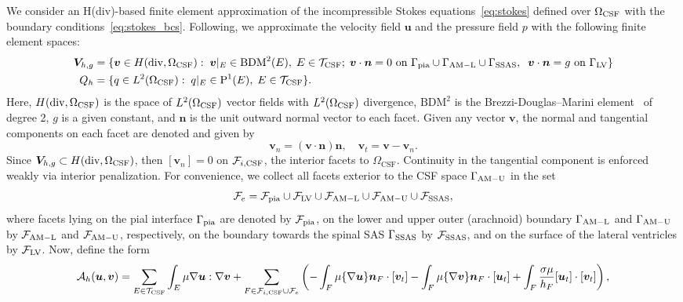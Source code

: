 \documentclass[fleqn,10pt]{wlscirep}
\begin{document}
We consider an H(div)-based finite element approximation of the incompressible Stokes equations~\eqref{eq:stokes} defined over $\Omega_{\rm CSF}$ with the boundary conditions~\eqref{eq:stokes_bcs}. Following\cite{hong2016robust}, we approximate the velocity field $\bm u$ and the pressure field $p$ with the following finite element spaces:
\begin{align*}
  \bm V_{h,g} &= \{ \bm v  \in H(\mathrm{div}, \Omega_{\mathrm{CSF}}): \;
  \bm v \vert_{E} \in \mathrm{BDM}^2(E), \; E \in \mathcal{T}_{\rm CSF}; \;
  \bm v \cdot \bm n = 0
  \text{ on } \Gamma_{\rm{pia}} \cup \Gamma_{\rm AM-L} \cup \Gamma_{\rm{SSAS}}, \;\; \bm v \cdot \bm n =  g %
  \text{ on } \Gamma_{\mathrm{LV}} \}  \\ 
  Q_h  &= \{q \in L^2(\Omega_{\rm CSF}): \; q \vert_E \in \mathrm{P}^1(E),
  \; E \in \mathcal{T}_{\rm CSF} \}. 
\end{align*}
Here, $H(\mathrm{div}, \Omega_{\rm{CSF}})$ is the space of $L^2(\Omega_{\rm{CSF}})$ vector fields with $L^2(\Omega_{\rm{CSF}})$ divergence, $\mathrm{BDM}^2$ is the Brezzi-Douglas--Marini element~\cite{brezzi1987mixed} of degree 2, $g$ is a given constant, and $\bm n$ is the unit outward normal vector to each facet. Given any vector $\bm v$, the normal and tangential components on each facet are denoted and given by 
$$ \bm v_n = (\bm v \cdot \bm n) \bm n, \quad \bm v_t = \bm v - \bm v_n. 
$$ 
Since $\bm V_{h,g} \subset H(\mathrm{div}, \Omega_{\rm CSF})$, then $[\bm
  v_n] = 0 $ on $\mathcal{F}_{i, \rm CSF}$, the interior facets to $\Omega_{\mathrm{CSF}}$. Continuity in the
tangential component is enforced weakly via interior penalization. For
convenience, we collect all facets exterior to the CSF space  $\Gamma_{\rm AM-U}$ in the set
$$\mathcal{F}_{e} = \mathcal{F}_{\rm pia} \cup \mathcal{F}_{\rm LV}
\cup \mathcal{F}_{\rm AM-L}\cup \mathcal{F}_{\rm AM-U}  \cup \mathcal{F}_{\rm SSAS}, $$ 
where facets
lying on the pial interface $\Gamma_{\rm pia}$ are denoted by
$\mathcal{F}_{\rm pia}$, on the lower and upper outer (arachnoid) boundary
$\Gamma_{\rm AM-L}$ and $\Gamma_{\rm AM-U}$ by $\mathcal{F}_{\rm AM-L}$ and $\mathcal{F}_{\rm AM-U}$, respectively, 
 on the boundary towards the spinal SAS $\Gamma_{\rm SSAS}$ by
$\mathcal{F}_{\rm SSAS}$, and on the surface of the lateral ventricles by $\mathcal{F}_{\rm LV}$. Now, define the form 
\begin{multline}
  \mathcal{A}_h(\bm u, \bm v)
  = \sum_{E \in \mathcal{T}_{\rm CSF}} \int_{E} \mu \nabla \bm u : \nabla \bm v
 + \sum_{F \in \mathcal{F}_{i, \rm CSF} \cup \mathcal{F}_{e}} \left (
  -\int_{F} \mu \{\nabla \bm u\}  \bm n_F \cdot [\bm v_t] 
  - %
  \int_{F} \mu \{\nabla \bm v\}  \bm n_F \cdot [\bm u_t]
  + %
\int_{F}   \frac{\sigma \mu}{h_F} [\bm u_t ] \cdot [\bm v_t] \right ),   
\end{multline}
\end{document}
